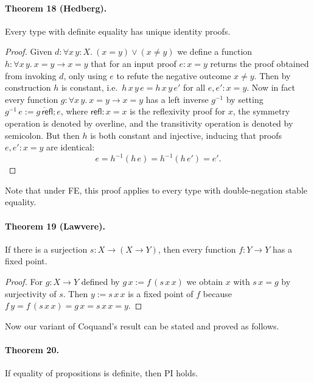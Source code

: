 \paragraph{Theorem 18 (Hedberg).} Every type with definite equality has unique identity proofs.
\begin{proof}
Given $d:\forall x\,y:X.\ (x=y)\lor(x\ne y)$ we define a function $h:\forall x\,y.\ x=y\to x=y$ that for an input proof $e:x=y$ returns the proof obtained from invoking $d$, only using $e$ to refute the negative outcome $x\ne y$.
Then by construction $h$ is constant, i.e.\ $h\,x\,y\,e=h\,x\,y\,e'$ for all $e,e':x=y$.
Now in fact every function $g:\forall x\,y.\ x=y\to x=y$ has a left inverse $g^{-1}$ by setting $g^{-1}\,e:=\overline{g\,\mathsf{refl}};e$, where $\mathsf{refl}:x=x$ is the reflexivity proof for $x$, the symmetry operation is denoted by overline, and the transitivity operation is denoted by semicolon.
But then $h$ is both constant and injective, inducing that proofs $e,e':x=y$ are identical:
\[
e=h^{-1}(h\,e)=h^{-1}(h\,e')=e'.
\]
\end{proof}
Note that under FE, this proof applies to every type with double-negation stable equality.
\paragraph{Theorem 19 (Lawvere).} If there is a surjection $s:X\to(X\to Y)$, then every function $f:Y\to Y$ has a fixed point.
\begin{proof}
For $g:X\to Y$ defined by $g\,x:=f\,(s\,x\,x)$ we obtain $x$ with $s\,x=g$ by surjectivity of $s$.
Then $y:=s\,x\,x$ is a fixed point of $f$ because $f\,y=f\,(s\,x\,x)=g\,x=s\,x\,x=y$.
\end{proof}
Now our variant of Coquand's result can be stated and proved as follows.

\paragraph{Theorem 20.} If equality of propositions is definite, then PI holds.

